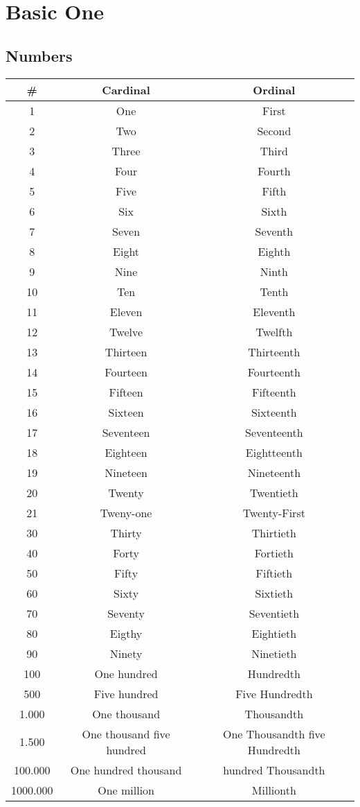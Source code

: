 \documentclass{elegantbook}
\begin{document}
\tableofcontents
\mainmatter
\hypersetup{pageanchor=true}
\chapter{Basic One}
    \section{Numbers}
    \begin{center}
        \begin{tabular}{c c c}
            \hline
            \# & Cardinal & Ordinal\\
            \hline
            1&One&First\\
            2&Two&Second\\
            3&Three&Third\\
            4&Four&Fourth\\
            5&Five&Fifth\\
            6&Six&Sixth\\
            7&Seven&Seventh\\
            8&Eight&Eighth\\
            9&Nine&Ninth\\
            10&Ten&Tenth\\
            11&Eleven&Eleventh\\
            12&Twelve&Twelfth\\
            13&Thirteen&Thirteenth\\
            14&Fourteen&Fourteenth\\
            15&Fifteen&Fifteenth\\
            16&Sixteen&Sixteenth\\
            17&Seventeen&Seventeenth\\
            18&Eighteen&Eightteenth\\
            19&Nineteen&Nineteenth\\
            20&Twenty&Twentieth\\
            21&Tweny-one&Twenty-First\\
            30&Thirty&Thirtieth\\
            40&Forty&Fortieth\\
            50&Fifty&Fiftieth\\
            60&Sixty&Sixtieth\\
            70&Seventy&Seventieth\\
            80&Eigthy&Eightieth\\
            90&Ninety&Ninetieth\\
            100&One hundred&Hundredth\\
            500&Five hundred&Five Hundredth\\
            1.000&One thousand&Thousandth\\
            1.500&One thousand five hundred&One Thousandth five Hundredth\\
            100.000&One hundred thousand&hundred Thousandth\\
            1000.000&One million&Millionth\\
        \end{tabular}
    \end{center}
\end{document}
